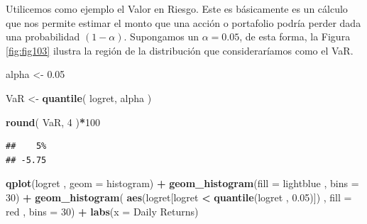 \documentclass[
]{book}
\newenvironment{Shaded}{\begin{snugshade}}{\end{snugshade}}
\newcommand{\AttributeTok}[1]{\textcolor[rgb]{0.13,0.29,0.53}{#1}}
\newcommand{\DecValTok}[1]{\textcolor[rgb]{0.00,0.00,0.81}{#1}}
\newcommand{\FloatTok}[1]{\textcolor[rgb]{0.00,0.00,0.81}{#1}}
\newcommand{\FunctionTok}[1]{\textcolor[rgb]{0.13,0.29,0.53}{\textbf{#1}}}
\newcommand{\NormalTok}[1]{#1}
\newcommand{\OtherTok}[1]{\textcolor[rgb]{0.56,0.35,0.01}{#1}}
\newcommand{\SpecialCharTok}[1]{\textcolor[rgb]{0.81,0.36,0.00}{\textbf{#1}}}
\newcommand{\StringTok}[1]{\textcolor[rgb]{0.31,0.60,0.02}{#1}}
\begin{document}
Utilicemos como ejemplo el Valor en Riesgo. Este es básicamente es un cálculo que nos permite estimar el monto que una acción o portafolio podría perder dada una probabilidad \((1-\alpha)\). Supongamos un \(\alpha = 0.05\), de esta forma, la Figura \ref{fig:fig103} ilustra la región de la distribución que consideraríamos como el VaR.

\begin{Shaded}
\begin{Highlighting}[]
\NormalTok{alpha }\OtherTok{\textless{}{-}} \FloatTok{0.05}

\NormalTok{VaR }\OtherTok{\textless{}{-}} \FunctionTok{quantile}\NormalTok{( logret, alpha )}

\FunctionTok{round}\NormalTok{( VaR, }\DecValTok{4}\NormalTok{ )}\SpecialCharTok{*}\DecValTok{100}
\end{Highlighting}
\end{Shaded}

\begin{verbatim}
##    5% 
## -5.75
\end{verbatim}

\begin{Shaded}
\begin{Highlighting}[]
\FunctionTok{qplot}\NormalTok{(logret , }\AttributeTok{geom =} \StringTok{\textquotesingle{}histogram\textquotesingle{}}\NormalTok{) }\SpecialCharTok{+} 
  \FunctionTok{geom\_histogram}\NormalTok{(}\AttributeTok{fill =} \StringTok{\textquotesingle{}lightblue\textquotesingle{}}\NormalTok{ , }\AttributeTok{bins =} \DecValTok{30}\NormalTok{) }\SpecialCharTok{+}
  \FunctionTok{geom\_histogram}\NormalTok{( }\FunctionTok{aes}\NormalTok{(logret[logret }\SpecialCharTok{\textless{}} \FunctionTok{quantile}\NormalTok{(logret , }\FloatTok{0.05}\NormalTok{)]) , }
                  \AttributeTok{fill =} \StringTok{\textquotesingle{}red\textquotesingle{}}\NormalTok{ , }\AttributeTok{bins =} \DecValTok{30}\NormalTok{) }\SpecialCharTok{+}
  \FunctionTok{labs}\NormalTok{(}\AttributeTok{x =} \StringTok{\textquotesingle{}Daily Returns\textquotesingle{}}\NormalTok{)}
\end{Highlighting}
\end{Shaded}
\end{document}
